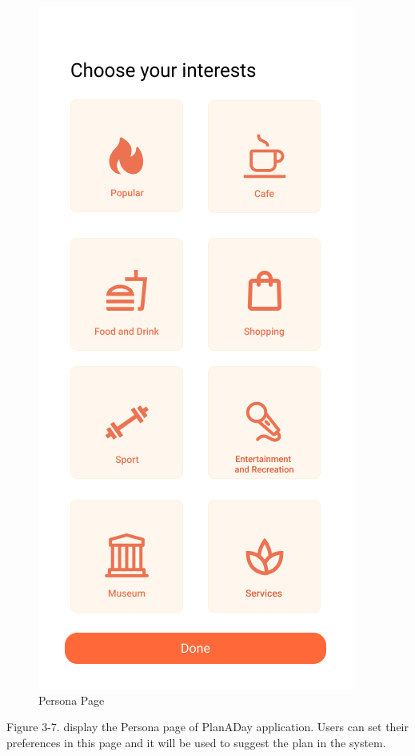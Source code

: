 \newpage
\begin{figure}[!h]
    \centering
    \includegraphics[width=0.5\linewidth]{chapter3/UI_Persona_page.png}
    \caption{Persona Page}
    \label{fig:Persona Page}
\end{figure}
\noindent
Figure 3-7. display the Persona page of PlanADay application. Users can set their
preferences in this page and it will be used to suggest the plan in the system.

